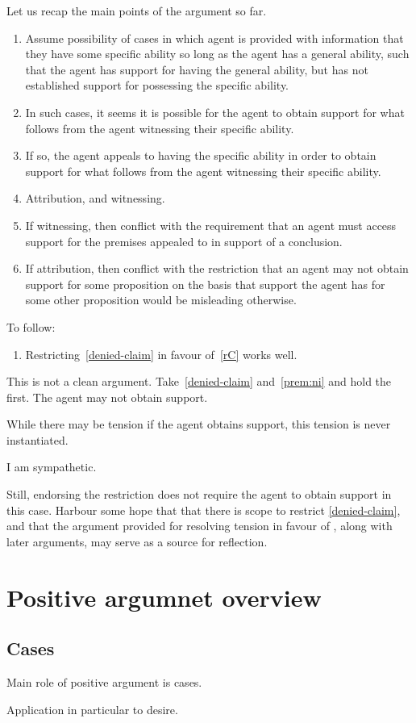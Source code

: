 \begin{note}
  Let us recap the main points of the argument so far.
  \begin{enumerate}
  \item Assume possibility of cases in which agent is provided with information that they have some specific ability so long as the agent has a general ability, such that the agent has support for having the general ability, but has not established support for possessing the specific ability.
  \item In such cases, it seems it is possible for the agent to obtain support for what follows from the agent witnessing their specific ability.
  \item If so, the agent appeals to having the specific ability in order to obtain support for what follows from the agent witnessing their specific ability.
  \item Attribution, and witnessing.
  \item If witnessing, then conflict with the requirement that an agent must access support for the premises appealed to in support of a conclusion.
  \item If attribution, then conflict with the restriction that an agent may not obtain support for some proposition on the basis that support the agent has for some other proposition would be misleading otherwise.
  \end{enumerate}

  To follow:
  \begin{enumerate}
  \item Restricting~\ref{denied-claim} in favour of~\ref{rC} works well.
  \end{enumerate}
\end{note}

\begin{note}
  This is not a clean argument.
  Take~\ref{denied-claim} and~\ref{prem:ni} and hold the first.
  The agent may not obtain support.

  While there may be tension if the agent obtains support, this tension is never instantiated.

  I am sympathetic.

  Still, endorsing the restriction does not require the agent to obtain support in this case.
  Harbour some hope that that there is scope to restrict \ref{denied-claim}, and that the argument provided for resolving tension in favour of \rC{}, along with later arguments, may serve as a source for reflection.
\end{note}

\section{Positive argumnet overview}
\label{sec:posit-argumn-overv}

\subsection{Cases}
\label{sec:cases}

\begin{note}
  Main role of positive argument is cases.
\end{note}

\begin{note}
  Application in particular to desire.
\end{note}